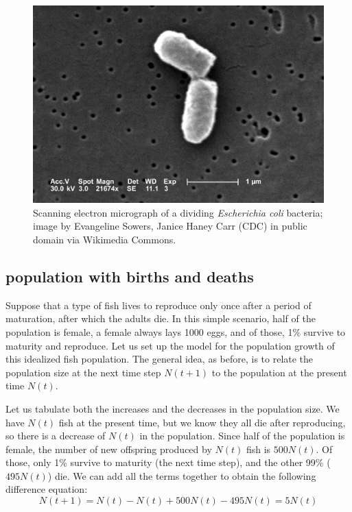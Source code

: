 \documentclass[
  letterpaper,
  DIV=11,
  numbers=noendperiod]{scrreprt}
\begin{document}
\begin{figure}

{\centering \includegraphics{./ch14/Ecoli_dividing.png}

}

\caption{Scanning electron micrograph of a dividing \emph{Escherichia
coli} bacteria; image by Evangeline Sowers, Janice Haney Carr (CDC) in
public domain via Wikimedia Commons.}

\end{figure}

\hypertarget{population-with-births-and-deaths}{%
\subsection{population with births and
deaths}\label{population-with-births-and-deaths}}

Suppose that a type of fish lives to reproduce only once after a period
of maturation, after which the adults die. In this simple scenario, half
of the population is female, a female always lays 1000 eggs, and of
those, 1\% survive to maturity and reproduce. Let us set up the model
for the population growth of this idealized fish population. The general
idea, as before, is to relate the population size at the next time step
\(N(t+1)\) to the population at the present time \(N(t)\).

Let us tabulate both the increases and the decreases in the
population size.
We have \(N(t)\) fish at the present time, but we know they all die
after reproducing, so there is a decrease of \(N(t)\) in the population.
Since half of the population is female, the number of new offspring
produced by \(N(t)\) fish is \(500N(t)\). Of those, only 1\% survive to
maturity (the next time step), and the other 99\% (\(495N(t)\)) die. We
can add all the terms together to obtain the following difference
equation: \[ 
N(t+1) = N(t) - N(t) + 500N(t) - 495 N(t)  = 5N(t)
\]
\end{document}
